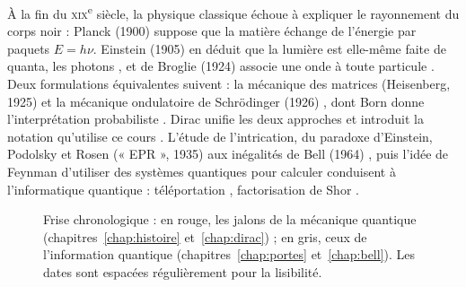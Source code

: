 À la fin du \textsc{xix}\textsuperscript{e} siècle, la physique classique échoue à expliquer
le rayonnement du corps noir : Planck (1900) suppose que la matière échange de l'énergie par
paquets $E=h\nu$. Einstein (1905) en déduit que la lumière est elle-même faite de quanta, les
photons \parencite{einstein1905}, et de Broglie (1924) associe une onde à toute particule
\parencite{debroglie1925}. Deux formulations équivalentes suivent : la mécanique des matrices
(Heisenberg, 1925) et la mécanique ondulatoire de Schrödinger (1926)
\parencite{schrodinger1926}, dont Born donne l'interprétation probabiliste
\parencite{born1926}. Dirac unifie les deux approches \parencite{dirac1930} et introduit la
notation qu'utilise ce cours \parencite{dirac1939}. L'étude de l'intrication, du paradoxe d'Einstein, Podolsky et Rosen (« EPR », 1935) aux
inégalités de Bell (1964) \parencite{einstein1935,bell1964}, puis l'idée de Feynman d'utiliser
des systèmes quantiques pour calculer \parencite{feynman1982} conduisent à l'informatique
quantique : téléportation \parencite{bennett1993}, factorisation de Shor \parencite{shor1997}.

\begin{figure}[!ht]
\centering
{}
\caption{Frise chronologique : en rouge, les jalons de la mécanique quantique (chapitres~\ref{chap:histoire}
et~\ref{chap:dirac}) ; en gris, ceux de l'information quantique (chapitres~\ref{chap:portes}
et~\ref{chap:bell}). Les dates sont espacées régulièrement pour la lisibilité.}
\label{fig:frise}
\end{figure}

